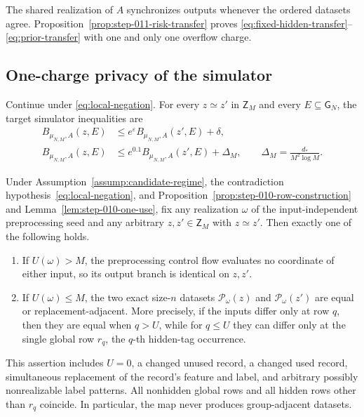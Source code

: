 The shared realization of $A$ synchronizes outputs whenever the ordered
datasets agree.  Proposition~\ref{prop:step-011-risk-transfer} proves
\eqref{eq:fixed-hidden-transfer}--\eqref{eq:prior-transfer} with one and
only one overflow charge.

\subsection{One-charge privacy of the simulator}\label{app:step-012}
Continue under \eqref{eq:local-negation}.  For every
$z\simeq z'$ in $\mathsf Z_M$ and every $E\subseteq\mathsf G_N$, the
target simulator inequalities are
\begin{align}
B_{\mu_{N,M},A}(z,E)
&\le e^\varepsilon B_{\mu_{N,M},A}(z',E)+\delta,
\tag{S12.4}\label{eq:simulator-dp}\\
B_{\mu_{N,M},A}(z,E)
&\le e^{0.1}B_{\mu_{N,M},A}(z',E)+\Delta_M,
\qquad
\Delta_M=\frac{d_*}{M^2\log M}.
\tag{S12.6}\label{eq:simulator-source-cap}
\end{align}
\begin{lemma}\label{lem:step-012-one-row-map}
Under Assumption~\ref{assump:candidate-regime}, the contradiction hypothesis~\eqref{eq:local-negation},
and Proposition~\ref{prop:step-010-row-construction} and
Lemma~\ref{lem:step-010-one-use}, fix any realization \(\omega\) of
the input-independent preprocessing seed and any arbitrary
\(z,z'\in\mathsf Z_M\) with \(z\simeq z'\).  Then exactly one of the
following holds.

\begin{enumerate}
\item If \(U(\omega)>M\), the preprocessing control flow evaluates no
   coordinate of either input, so its output branch is identical on
   \(z,z'\).
\item If \(U(\omega)\le M\), the two exact size-\(n\) datasets
   \(\mathcal P_\omega(z)\) and \(\mathcal P_\omega(z')\) are equal or
   replacement-adjacent.  More precisely, if the inputs differ only at
   row \(q\), then they are equal when \(q>U\), while for \(q\le U\)
   they can differ only at the single global row \(r_q\), the \(q\)-th
   hidden-tag occurrence.
\end{enumerate}

This assertion includes \(U=0\), a changed unused record, a changed used
record, simultaneous replacement of the record's feature and label, and
arbitrary possibly nonrealizable label patterns.  All nonhidden global
rows and all hidden rows other than \(r_q\) coincide.  In particular, the
map never produces group-adjacent datasets.
\end{lemma}

